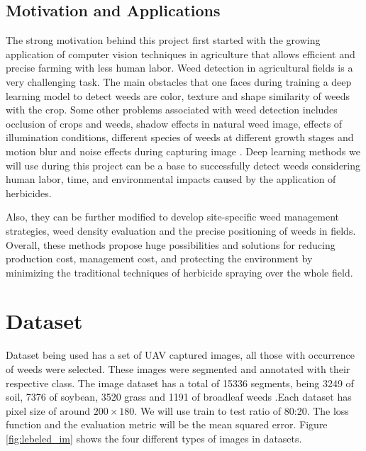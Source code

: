 \documentclass{report}
\begin{document}
\subsection{Motivation and Applications}
The strong motivation behind this project first started with the growing application of computer vision techniques in agriculture that allows efficient and precise farming with less human labor. Weed detection in agricultural fields is a very challenging task. The main obstacles that one faces during training a deep learning model to detect weeds are color, texture and shape similarity of weeds with the crop. Some other problems associated with weed detection includes occlusion of crops and weeds, shadow effects in natural weed image, effects of illumination conditions, different species of weeds at different growth stages and motion blur and noise effects during capturing image \cite{hasan2021survey}. Deep learning methods we will use during this project can be a base to successfully detect weeds considering human labor, time, and environmental impacts caused by the application of herbicides.\par
Also, they can be further modified to develop site-specific weed management strategies, weed density evaluation and the precise positioning of weeds in fields. Overall, these methods propose huge possibilities and solutions for reducing production cost, management cost, and protecting the environment by minimizing the traditional techniques of herbicide spraying over the whole field.

\section{Dataset}
Dataset being used has a set of UAV captured images, all those with occurrence of weeds were selected. These images were segmented and annotated with their respective class. The image dataset has a total of 15336 segments, being 3249 of soil, 7376 of soybean, 3520 grass and 1191 of broadleaf weeds \cite{kaggle}.Each dataset has pixel size of around $200\times180$. We will use train to test ratio of 80:20. The loss function and the evaluation metric will be the mean squared error. Figure \ref{fig:lebeled_im} shows the four different types of images in datasets.
\end{document}
